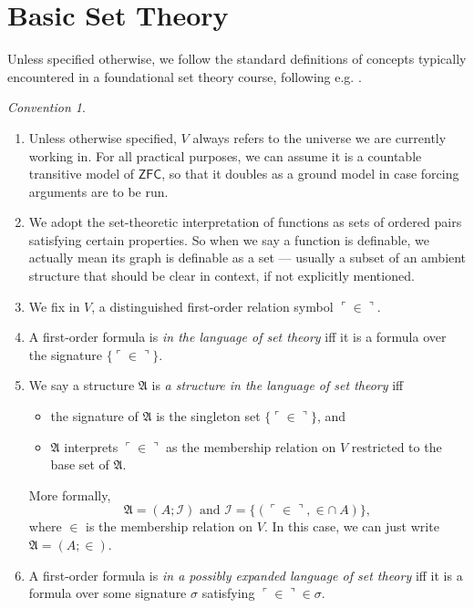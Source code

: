 \documentclass[12pt, twoside]{memoir}
\numberwithin{equation}{section}
\theoremstyle{definition}
\theoremstyle{remark}
\newtheorem{con}[thm]{Convention}
\theoremstyle{definition}
\theoremstyle{definition}
\theoremstyle{definition}
\theoremstyle{remark}
\begin{document}
\section{Basic Set Theory}

Unless specified otherwise, we follow the standard definitions of concepts typically encountered in a foundational set theory course, following e.g. \cite{jechhrbacek}.

\begin{con}
\leavevmode
\begin{enumerate}[label=(\arabic*)]
    \item Unless otherwise specified, $V$ always refers to the universe we are currently working in. For all practical purposes, we can assume it is a countable transitive model of $\mathsf{ZFC}$, so that it doubles as a ground model in case forcing arguments are to be run.
    \item We adopt the set-theoretic interpretation of functions as sets of ordered pairs satisfying certain properties. So when we say a function is definable, we actually mean its graph is definable as a set --- usually a subset of an ambient structure that should be clear in context, if not explicitly mentioned.
    \item We fix in $V$, a distinguished first-order relation symbol $\ulcorner \in \urcorner$.
    \item A first-order formula is \emph{in the language of set theory} iff it is a formula over the signature $\{\ulcorner \in \urcorner\}$.
    \item\label{stcon1} We say a structure $\mathfrak{A}$ is \emph{a structure in the language of set theory} iff 
    \begin{itemize}
        \item the signature of $\mathfrak{A}$ is the singleton set $\{\ulcorner \in \urcorner\}$, and
        \item $\mathfrak{A}$ interprets $\ulcorner \in \urcorner$ as the membership relation on $V$ restricted to the base set of $\mathfrak{A}$.
    \end{itemize}
    More formally, $$\mathfrak{A} = (A; \mathcal{I}) \text{ and } \mathcal{I} = \{(\ulcorner \in \urcorner, \in \cap \ A)\},$$ where $\in$ is the membership relation on $V$. In this case, we can just write $\mathfrak{A} = (A; \in)$.
    \item A first-order formula is \emph{in a possibly expanded language of set theory} iff it is a formula over some signature $\sigma$ satisfying $\ulcorner \in \urcorner \in \sigma$.

\end{enumerate}
\end{con}
\end{document}
